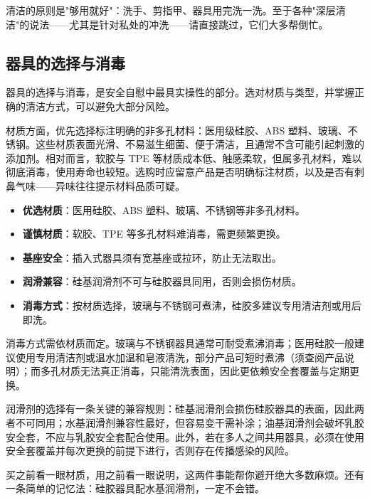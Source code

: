 \documentclass[12pt,UTF8]{ctexbook}
\newcommand{\keyword}[1]{\textbf{#1}}
\begin{document}
\begin{tcolorbox}[colback=pink!5!white,colframe=red!50!black,title=贴心小叮咛]
	清洁的原则是"够用就好"：洗手、剪指甲、器具用完洗一洗。至于各种"深层清洁"的说法——尤其是针对私处的冲洗——请直接跳过，它们大多帮倒忙。
\end{tcolorbox}
\subsection{器具的选择与消毒}

器具的选择与消毒，是安全自慰中最具实操性的部分。选对材质与类型，并掌握正确的清洁方式，可以避免大部分风险。

材质方面，优先选择标注明确的非多孔材料：医用级硅胶、ABS 塑料、玻璃、不锈钢。这些材质表面光滑、不易滋生细菌、便于清洁，且通常不含可能引起刺激的添加剂。相对而言，软胶与 TPE 等材质成本低、触感柔软，但属多孔材料，难以彻底消毒，使用寿命也较短。选购时应留意产品是否明确标注材质，以及是否有刺鼻气味——异味往往提示材料品质可疑。

\begin{itemize}
	\item \keyword{优选材质}：医用硅胶、ABS 塑料、玻璃、不锈钢等非多孔材料。
	\item \keyword{谨慎材质}：软胶、TPE 等多孔材料难消毒，需更频繁更换。
	\item \keyword{基座安全}：插入式器具须有宽基座或拉环，防止无法取出。
	\item \keyword{润滑兼容}：硅基润滑剂不可与硅胶器具同用，否则会损伤材质。
	\item \keyword{消毒方式}：按材质选择，玻璃与不锈钢可煮沸，硅胶多建议专用清洁剂或用后即洗。
\end{itemize}

消毒方式需依材质而定。玻璃与不锈钢器具通常可耐受煮沸消毒；医用硅胶一般建议使用专用清洁剂或温水加温和皂液清洗，部分产品可短时煮沸（须查阅产品说明）；而多孔材质无法真正消毒，只能清洗表面，因此更依赖安全套覆盖与定期更换。

润滑剂的选择有一条关键的兼容规则：硅基润滑剂会损伤硅胶器具的表面，因此两者不可同用；水基润滑剂兼容性最好，但容易变干需补涂；油基润滑剂会破坏乳胶安全套，不应与乳胶安全套配合使用。此外，若在多人之间共用器具，必须在使用安全套覆盖并每次更换的前提下进行，否则存在传播感染的风险。

\begin{tcolorbox}[colback=pink!5!white,colframe=red!50!black,title=贴心小叮咛]
	买之前看一眼材质，用之前看一眼说明，这两件事能帮你避开绝大多数麻烦。还有一条简单的记忆法：硅胶器具配水基润滑剂，一定不会错。
\end{tcolorbox}
\end{document}
